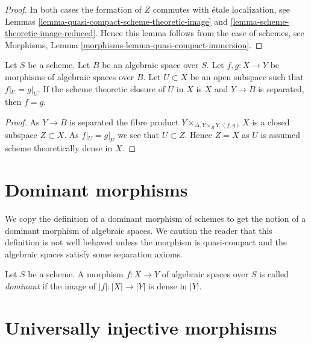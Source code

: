 \begin{proof}
In both cases the formation of $\overline{Z}$ commutes with
\'etale localization, see
Lemmas \ref{lemma-quasi-compact-scheme-theoretic-image} and
\ref{lemma-scheme-theoretic-image-reduced}.
Hence this lemma follows from the case of schemes, see
Morphisms, Lemma \ref{morphisms-lemma-quasi-compact-immersion}.
\end{proof}

\begin{lemma}
\label{lemma-equality-of-morphisms}
Let $S$ be a scheme. Let $B$ be an algebraic space over $S$.
Let $f, g : X \to Y$ be morphisms of algebraic spaces over $B$.
Let $U \subset X$ be an open subspace such that
$f|_U = g|_U$. If the scheme theoretic closure of $U$
in $X$ is $X$ and $Y \to B$ is separated, then $f = g$.
\end{lemma}

\begin{proof}
As $Y \to B$ is separated the fibre product
$Y \times_{\Delta, Y \times_B Y, (f, g)} X$ is a closed subspace $Z \subset X$. 
As $f|_U = g|_U$ we see that $U \subset Z$. Hence $Z = X$ as $U$ is assumed
scheme theoretically dense in $X$.
\end{proof}






\section{Dominant morphisms}
\label{section-dominant}

\noindent
We copy the definition of a dominant morphism of schemes to get the
notion of a dominant morphism of algebraic spaces. We caution the
reader that this definition is not well behaved unless the morphism
is quasi-compact and the algebraic spaces satisfy some separation
axioms.

\begin{definition}
\label{definition-dominant}
Let $S$ be a scheme. A morphism $f : X \to Y$ of algebraic spaces over $S$ is
called {\it dominant} if the image of $|f| : |X| \to |Y|$ is dense in $|Y|$.
\end{definition}






\section{Universally injective morphisms}
\label{section-universally-injective}

